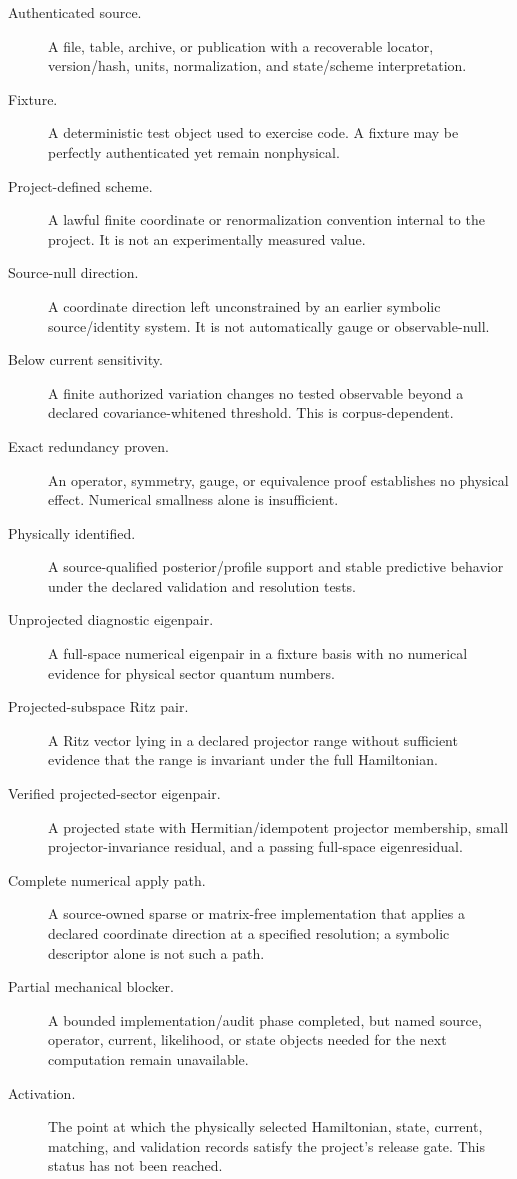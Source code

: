 \documentclass[11pt,oneside]{book}
\begin{document}
\begin{description}
 \item[Authenticated source.] A file, table, archive, or publication with a recoverable locator, version/hash, units, normalization, and state/scheme interpretation.
 \item[Fixture.] A deterministic test object used to exercise code.  A fixture may be perfectly authenticated yet remain nonphysical.
 \item[Project-defined scheme.] A lawful finite coordinate or renormalization convention internal to the project.  It is not an experimentally measured value.
 \item[Source-null direction.] A coordinate direction left unconstrained by an earlier symbolic source/identity system.  It is not automatically gauge or observable-null.
 \item[Below current sensitivity.] A finite authorized variation changes no tested observable beyond a declared covariance-whitened threshold.  This is corpus-dependent.
 \item[Exact redundancy proven.] An operator, symmetry, gauge, or equivalence proof establishes no physical effect.  Numerical smallness alone is insufficient.
 \item[Physically identified.] A source-qualified posterior/profile support and stable predictive behavior under the declared validation and resolution tests.
 \item[Unprojected diagnostic eigenpair.] A full-space numerical eigenpair in a fixture basis with no numerical evidence for physical sector quantum numbers.
 \item[Projected-subspace Ritz pair.] A Ritz vector lying in a declared projector range without sufficient evidence that the range is invariant under the full Hamiltonian.
 \item[Verified projected-sector eigenpair.] A projected state with Hermitian/idempotent projector membership, small projector-invariance residual, and a passing full-space eigenresidual.
 \item[Complete numerical apply path.] A source-owned sparse or matrix-free implementation that applies a declared coordinate direction at a specified resolution; a symbolic descriptor alone is not such a path.
 \item[Partial mechanical blocker.] A bounded implementation/audit phase completed, but named source, operator, current, likelihood, or state objects needed for the next computation remain unavailable.
 \item[Activation.] The point at which the physically selected Hamiltonian, state, current, matching, and validation records satisfy the project's release gate.  This status has not been reached.
\end{description}
\end{document}

